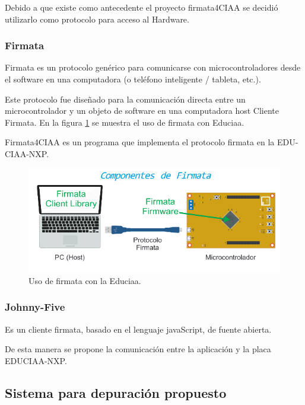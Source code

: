 Debido a que existe como antecedente el proyecto firmata4CIAA se decidió utilizarlo como protocolo para acceso al Hardware.


\subsubsection{Firmata}
\label{sec:Firmata}

Firmata es un protocolo genérico para comunicarse con microcontroladores desde
el software en una computadora (o teléfono inteligente / tableta, etc.).

Este protocolo fue diseñado para la comunicación directa entre un microcontrolador y un objeto de software en una computadora host Cliente Firmata. En la figura \ref{fig:componentesFirmata} se muestra el uso de firmata con Educiaa.

Firmata4CIAA es un programa que implementa el protocolo firmata en la EDU-CIAA-NXP.

\begin{figure}[h]
	\centering
	\includegraphics[scale=.80]{./Figures/componentesFirmata.png}
	\caption{Uso de firmata con la Educiaa.}
	\label{fig:componentesFirmata}
\end{figure}

\subsubsection{Johnny-Five}
\label{subsec:Johnny-Five}

Es un cliente firmata, basado en el lenguaje javaScript, de fuente
abierta. 

De esta manera se propone la comunicación entre la aplicación y la placa EDUCIAA-NXP.

\subsection{Sistema para depuración propuesto}

